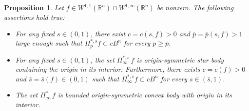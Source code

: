 \documentclass[11pt, reqno]{article}
\newtheorem{proposition}[theorem]{Proposition}
\theoremstyle{definition}
\numberwithin{equation}{section}
\newcommand{\R}{\mathbb{R}}
\begin{document}
\begin{proposition}\label{prop.exist.infi.polar}
    Let $f \in W^{1, 1}(\R^n) \cap W^{1, \infty}(\R^n)$ be nonzero.
    The following assertions hold true:
    \begin{itemize}
        \item[(i)] 
        For any fixed $s \in (0, 1)$, there exist $c = c(s, f) > 0$ and $\bar p = \bar p(s, f) > 1$ large enough such that $\Pi^{\ast, s}_p f \subset c B^n$ for every $p \geq \bar p$. 
        
        \item[(ii)] 
        For any fixed $s \in (0, 1)$, the set $\Pi^{\ast, s}_\infty \, f$ is origin-symmetric star body containing the origin in its interior.
        Furthermore, there exists $c = c(f) > 0$ and $\bar s = \bar s(f) \in (0, 1)$ such that $\Pi^{\ast, s}_\infty f \subset c B^n$ for every $s \in (\bar s, 1)$.

        \item[(iii)]
        The set $\Pi^{\ast}_\infty \, f$ is bounded origin-symmetric convex body with origin in its interior.
    \end{itemize}
\end{proposition}
\end{document}
